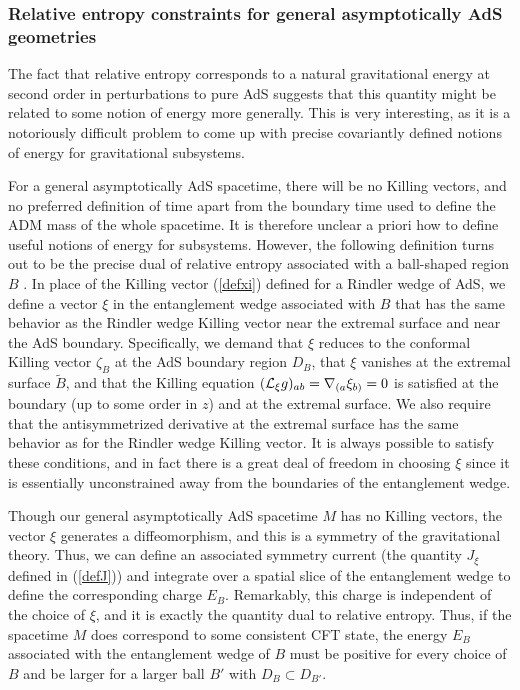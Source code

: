 \documentclass[12pt,epsf]{article}
\begin{document}
\subsubsection*{Relative entropy constraints for general asymptotically AdS geometries}

The fact that relative entropy corresponds to a natural gravitational energy at second order in perturbations to pure AdS suggests that this quantity might be related to some notion of energy more generally. This is very interesting, as it is a notoriously difficult problem to come up with precise covariantly defined notions of energy for gravitational subsystems.

For a general asymptotically AdS spacetime, there will be no Killing vectors, and no preferred definition of time apart from the boundary time used to define the ADM mass of the whole spacetime. It is therefore unclear a priori how to define useful notions of energy for subsystems. However, the following definition turns out to be the precise dual of relative entropy associated with a ball-shaped region $B$ \cite{Lashkari:2016idm}. In place of the Killing vector (\ref{defxi}) defined for a Rindler wedge of AdS, we define a vector $\xi$ in the entanglement wedge associated with $B$ that has the same behavior as the Rindler wedge Killing vector near the extremal surface and near the AdS boundary. Specifically, we demand that $\xi$ reduces to the conformal Killing vector $\zeta_B$ at the AdS boundary region $D_B$, that $\xi$ vanishes at the extremal surface $\tilde{B}$, and that the Killing equation $({\cal L}_\xi g)_{ab}  = \nabla_{(a} \xi_{b)}= 0$ is satisfied at the boundary (up to some order in $z$) and at the extremal surface. We also require that the antisymmetrized derivative at the extremal surface has the same behavior as for the Rindler wedge Killing vector. It is always possible to satisfy these conditions, and in fact there is a great deal of freedom in choosing $\xi$ since it is essentially unconstrained away from the boundaries of the entanglement wedge.

Though our general asymptotically AdS spacetime $M$ has no Killing vectors, the vector $\xi$ generates a diffeomorphism, and this is a symmetry of the gravitational theory. Thus, we can define an associated symmetry current (the quantity $J_\xi$ defined in (\ref{defJ})) and integrate over a spatial slice of the entanglement wedge to define the corresponding charge $E_B$. Remarkably, this charge is independent of the choice of $\xi$, and it is exactly the quantity dual to relative entropy. Thus, if the spacetime $M$ does correspond to some consistent CFT state, the energy $E_B$ associated with the entanglement wedge of $B$ must be positive for every choice of $B$ and be larger for a larger ball $B'$ with $D_B \subset D_{B'}$.
\end{document}
